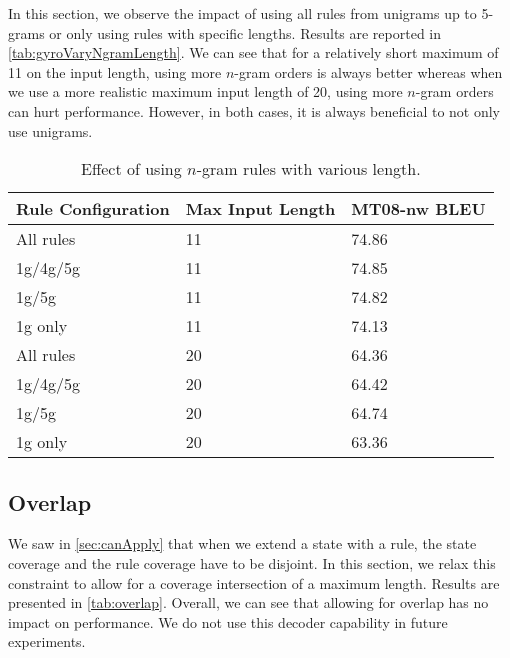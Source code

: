 In this section, we observe the impact of using all rules from unigrams
up to 5-grams or only using rules with specific lengths. Results
are reported in \autoref{tab:gyroVaryNgramLength}.
We can see that for a relatively short maximum of 11 on the input length,
using more $n$-gram orders is always better whereas when we use
a more realistic maximum input length of 20, using more $n$-gram orders
can hurt performance. However, in both cases, it is always beneficial
to not only use unigrams.
%
\begin{table}
  \begin{center}
  \begin{tabular}{l|l|l}
    Rule Configuration & Max Input Length & MT08-nw BLEU \\
    \hline
    All rules & 11 & 74.86 \\
    1g/4g/5g & 11 & 74.85 \\
    1g/5g & 11 & 74.82 \\
    1g only & 11 & 74.13 \\
    \hline
    All rules & 20 & 64.36 \\
    1g/4g/5g & 20 & 64.42 \\
    1g/5g & 20 & 64.74 \\
    1g only & 20 & 63.36 \\
  \end{tabular}
  \caption{Effect of using $n$-gram rules with various length.}
  \label{tab:gyroVaryNgramLength}
  \end{center}
\end{table}

\subsection{Overlap}
\label{sec:overlap}

We saw in \autoref{sec:canApply} that when we extend
a state with a rule, the state coverage and the rule
coverage have to be disjoint. In this section, we relax
this constraint to allow for a coverage intersection
of a maximum length. Results are presented in
\autoref{tab:overlap}. Overall, we can see
that allowing for overlap has no impact on performance.
We do not use this decoder capability in future experiments.

